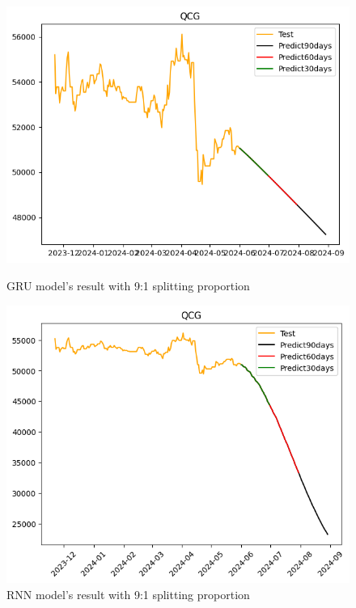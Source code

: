 \documentclass{ieeeojies}
\begin{document}
\begin{figure}[H]
  \centering
  \begin{minipage}{0.23\textwidth}
  \centering
  \includegraphics[width=1\textwidth]{bibliography/Figure/QCGGRU_9-1.png}
  \caption{GRU model's result with 9:1 splitting proportion}
  \label{fig:1}
  \end{minipage}
  \hfill
  \begin{minipage}{0.23\textwidth}
  \centering
  \includegraphics[width=1\textwidth]{bibliography/Figure/QCGRNN_9-1.png}
  \caption{RNN model's result with 9:1 splitting proportion}
  \label{fig:2}
  \end{minipage}
\end{figure}
\end{document}

